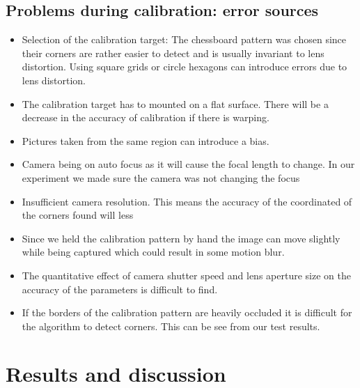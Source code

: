     
    
    
        
        \subsection{Problems during calibration: error sources}
        \begin{itemize}
            \item Selection of the calibration target: The chessboard pattern was chosen since their corners are rather easier to detect and is usually invariant to lens distortion. Using square grids or circle hexagons can introduce errors due to lens distortion.
            \item The calibration target has to mounted on a flat surface. There will be a decrease in the accuracy of calibration if there is warping.
            \item Pictures taken from the same region can introduce a bias.
            \item Camera being on auto focus as it will cause the focal length to change. In our experiment we made sure the camera was not changing the focus
            \item Insufficient camera resolution. This means the accuracy of the coordinated of the corners found will less
            \item Since we held the calibration pattern by hand the image can move slightly while being captured which could result in some motion blur.
            
            \item The quantitative effect of camera shutter speed and lens aperture size on the accuracy of the parameters is difficult to find.
            
            \item If the borders of the calibration pattern are heavily occluded it is difficult for the algorithm to detect corners. This can be see from our test results.
        \end{itemize}
    
   \section{Results and discussion}\label{Results}
   
